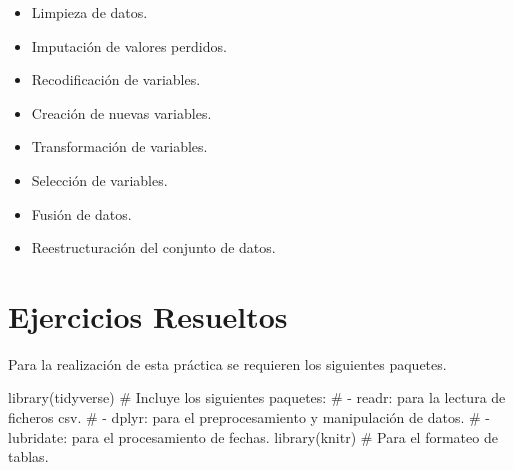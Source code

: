 \documentclass[
  spanish,
  a4paper,
]{scrreport}
\newenvironment{Shaded}{\begin{snugshade}}{\end{snugshade}}
\newcommand{\CommentTok}[1]{\textcolor[rgb]{0.37,0.37,0.37}{#1}}
\newcommand{\FunctionTok}[1]{\textcolor[rgb]{0.28,0.35,0.67}{#1}}
\newcommand{\NormalTok}[1]{\textcolor[rgb]{0.00,0.23,0.31}{#1}}
\providecommand{\tightlist}{%
  \setlength{\itemsep}{0pt}\setlength{\parskip}{0pt}}
\theoremstyle{definition}
\theoremstyle{remark}
\begin{document}
\begin{itemize}
\tightlist
\item
  Limpieza de datos.
\item
  Imputación de valores perdidos.
\item
  Recodificación de variables.
\item
  Creación de nuevas variables.
\item
  Transformación de variables.
\item
  Selección de variables.
\item
  Fusión de datos.
\item
  Reestructuración del conjunto de datos.
\end{itemize}

\section{Ejercicios Resueltos}\label{ejercicios-resueltos-1}

Para la realización de esta práctica se requieren los siguientes
paquetes.

\begin{Shaded}
\begin{Highlighting}[]
\FunctionTok{library}\NormalTok{(tidyverse) }
\CommentTok{\# Incluye los siguientes paquetes:}
\CommentTok{\# {-} readr: para la lectura de ficheros csv. }
\CommentTok{\# {-} dplyr: para el preprocesamiento y manipulación de datos.}
\CommentTok{\# {-} lubridate: para el procesamiento de fechas.}
\FunctionTok{library}\NormalTok{(knitr) }\CommentTok{\# Para el formateo de tablas.}
\end{Highlighting}
\end{Shaded}
\end{document}
